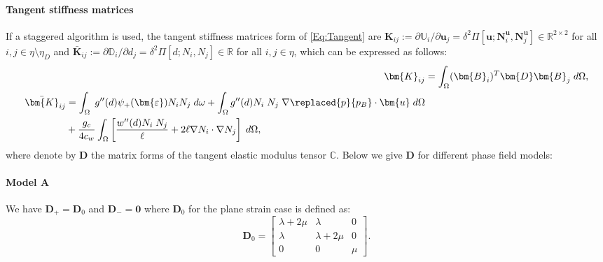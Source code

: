 \paragraph{Tangent stiffness matrices} If a staggered algorithm is used, the tangent stiffness matrices form of \eqref{Eq:Tangent} are $\mathbf{K}_{ij}:=\partial\mathbb{U}_i/\partial\mathbf{u}_j=\delta^2\Pi[\bm{u};\bm{N}^{\bm{u}}_i, \bm{N}^{\bm{u}}_j]\in \mathbb{R}^{2\times 2}$ for all $i,j\in\eta\setminus\eta_D$ and $ \bar{\bm{K}}_{ij} :=\partial\mathbb{D}_i/\partial {d}_j=\delta^2\Pi[{d};{N}_i, {N}_j]\in \mathbb{R}$ for all $i,j\in\eta$, which can be expressed as follows:
\begin{subequations}
    \begin{align}
        \bm{K}_{ij} &= \int_\Omega (\bm{B}_i)^T \bm{D} \bm{B}_j \;d\Omega,\\
    \begin{split}
        \bar{\bm{K}}_{ij} &= \int_\Omega \;g''(d) \psi_+(\bm{\varepsilon}) N_i N_j\; d\omega
        + \int_{\Omega} g''(d) N_i \; N_j \; \nabla \replaced{p}{p_B} \cdot {{\bm{u}}} \; d\Omega 
	    \\ &+ \frac{g_c}{4c_w} \int_\Omega \left[\frac{w''(d) N_i \; N_j}{\ell} + 2\ell \nabla N_i \cdot \nabla N_j \right]\;d\Omega,
    \end{split}
    \end{align}
\end{subequations}
where denote by $\mathbf{D}$ the matrix forms of the tangent elastic modulus tensor $\mathbb{C}$. Below we give $\mathbf{D}$ for different phase field models:
\paragraph{Model A} We have $\mathbf{D}_+=\mathbf{D}_0$ and $\mathbf{D}_-=\mathbf{0}$ 
where $\mathbf{D}_0$ for the plane strain case is defined as:
\begin{equation*}\label{Eq:D_0}
	    \bm{D}_{0} = \begin{bmatrix} 
	    \lambda+2\mu & \lambda & 0 \\
	    \lambda & \lambda+2\mu & 0 \\
	    0 & 0 & \mu
	   \end{bmatrix}.
\end{equation*}
 

